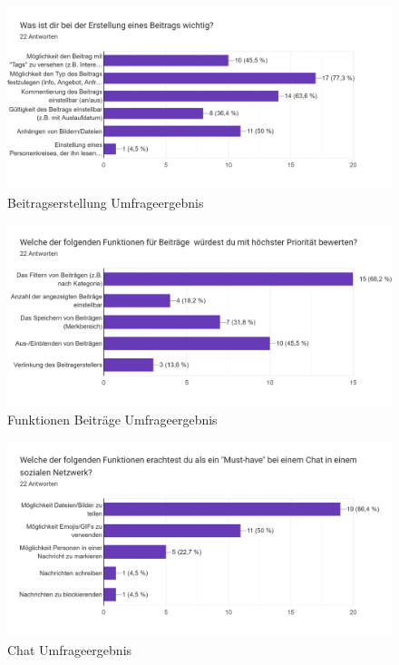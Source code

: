 \begin{figure}[!htb]
    \centering
    \includegraphics[width=1\textwidth]{figures/daniel/bild-14.png}
    \caption[shortcaption]{Beitragserstellung Umfrageergebnis}
    \label{fig:bild14}
\end{figure}

\begin{figure}[!htb]
    \centering
    \includegraphics[width=1\textwidth]{figures/daniel/bild-15.png}
    \caption[shortcaption]{Funktionen Beiträge Umfrageergebnis}
    \label{fig:bild15}
\end{figure}

\begin{figure}[!htb]
    \centering
    \includegraphics[width=1\textwidth]{figures/daniel/bild-16.png}
    \caption[shortcaption]{Chat Umfrageergebnis}
    \label{fig:bild16}
\end{figure}